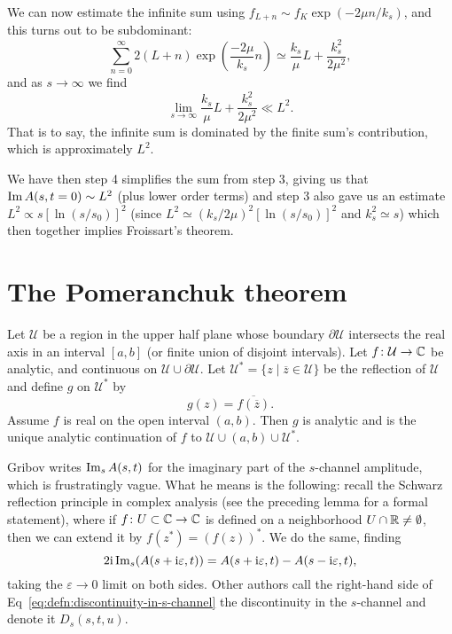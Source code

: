 We can now estimate the infinite sum using $f_{L+n}\sim f_{K}\exp(-2\mu n/k_{s})$,
and this turns out to be subdominant:
\begin{equation}
\sum^{\infty}_{n=0}2(L+n)\exp\left(\frac{-2\mu}{k_{s}}n\right)\simeq\frac{k_{s}}{\mu}L
+\frac{k_{s}^{2}}{2\mu^{2}},
\end{equation}
and as $s\to\infty$ we find
\begin{equation}
\lim_{s\to\infty}\frac{k_{s}}{\mu}L
+\frac{k_{s}^{2}}{2\mu^{2}}\ll L^{2}.
\end{equation}
That is to say, the infinite sum is dominated by the finite sum's
contribution, which is approximately $L^{2}$.

We have then step 4 simplifies the sum from step 3, giving us that
$\operatorname{Im}A(s,t=0)\sim L^{2}$ (plus lower order terms)
and step 3 also gave us an estimate $L^{2}\propto s[\ln(s/s_{0})]^{2}$
(since $L^{2}\simeq (k_{s}/2\mu)^{2}[\ln(s/s_{0})]^{2}$ and
$k_{s}^{2}\simeq s$)
which then together implies Froissart's theorem.\qquad\qedsymbol


\section{The Pomeranchuk theorem}

\begin{lemma}
Let $\mathcal{U}$ be a region in the upper half plane whose boundary
$\partial\mathcal{U}$ intersects the real axis in an interval $[a,b]$
(or finite union of disjoint intervals). Let $f\colon\mathcal{U}\to\mathbb{C}$
be analytic, and continuous on $\mathcal{U}\cup\partial\mathcal{U}$.
Let $\mathcal{U}^{*}=\{z\mid\overline{z}\in\mathcal{U}\}$ be the
reflection of $\mathcal{U}$ and define $g$ on $\mathcal{U}^{*}$ by
\begin{equation}
g(z) = \overline{f(\overline{z})}.
\end{equation}
Assume $f$ is real on the open interval $(a,b)$. Then $g$ is analytic
and is the unique analytic continuation of $f$ to
$\mathcal{U}\cup(a,b)\cup\mathcal{U}^{*}$.
\end{lemma}

Gribov writes $\operatorname{Im}_{s}A(s,t)$ for the imaginary part of the
$s$-channel amplitude, which is frustratingly vague. What he means is
the following: recall the Schwarz reflection principle in complex
analysis (see the preceding lemma for a formal statement), where if
$f\colon U\subset\mathbb{C}\to\mathbb{C}$ is defined on a
neighborhood $U\cap\mathbb{R}\neq\emptyset$, then we can extend it by
$f(z^{*})=(f(z))^{*}$.
We do the same, finding
\begin{equation}\label{eq:defn:discontinuity-in-s-channel}
2\mathrm{i}\operatorname{Im}_{s}(A(s+\mathrm{i}\varepsilon,t)) = A(s+\mathrm{i}\varepsilon,t)-A(s-\mathrm{i}\varepsilon,t),
\end{equation}
taking the $\varepsilon\to0$ limit on both sides.
Other authors call the right-hand side of Eq~\eqref{eq:defn:discontinuity-in-s-channel} the discontinuity in the $s$-channel and denote
it $D_{s}(s,t,u)$.
